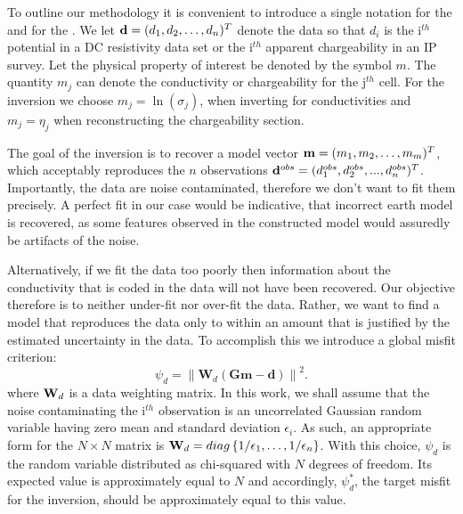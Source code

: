 To outline our methodology it is convenient to introduce a single notation for the  and for the . We let $\mathbf{d} = (d_1,d_2,\ldots,d_n)^T$ denote the data so that $d_i$ is the i$^{th}$ potential in a DC resistivity data set or the i$^{th}$ apparent chargeability in an IP survey. Let the physical property of interest be denoted by the symbol $m$. The quantity $m_j$ can denote the conductivity or chargeability for the j$^{th}$ cell. For the inversion we choose $m_j = \ln(\sigma_j)$, when inverting for conductivities and $m_j = \eta_j$ when reconstructing the chargeability section.

The goal of the inversion is to recover a model vector $\mathbf{m} = (m_1,m_2,\ldots,m_m)^T$, which acceptably reproduces the $n$ observations $\mathbf{d}^{obs} = (d_1^{obs},d_2^{obs},...,d_n^{obs})^T$. Importantly, the data are noise contaminated, therefore we don't want to fit them precisely. A perfect fit in our case would be indicative, that incorrect earth model is recovered, as some features observed in the constructed model would assuredly be artifacts of the noise.

Alternatively, if we fit the data too poorly then information about the conductivity that is coded in the data will not have been recovered. Our objective therefore is to neither under-fit nor over-fit the data. Rather, we want to find a model that reproduces the data only to within an amount that is justified by the estimated uncertainty in the data. To accomplish this we introduce a global misfit criterion:
%
\begin{equation}
\label{eq:phid}
\psi_d = \left\| \mathbf{W}_d(\mathbf{G}\mathbf{m}-\mathbf{d})\right\|^2.
\end{equation}
%
where $\mathbf{W}_d$ is a data weighting matrix. In this work, we shall assume that the noise contaminating the i$^{th}$ observation is an uncorrelated Gaussian random variable having zero mean and standard deviation $\epsilon_i$. As such, an appropriate form for the $N \times N$ matrix is $\mathbf{W}_d = diag\left\{1/\epsilon_1,\ldots,1/\epsilon_n\right\}$. With this choice, $\psi_d$ is the random variable distributed as chi-squared with $N$ degrees of freedom. Its expected value is approximately equal to $N$ and accordingly, $\psi_d^*$, the target misfit for the inversion, should be approximately equal to this value. 

